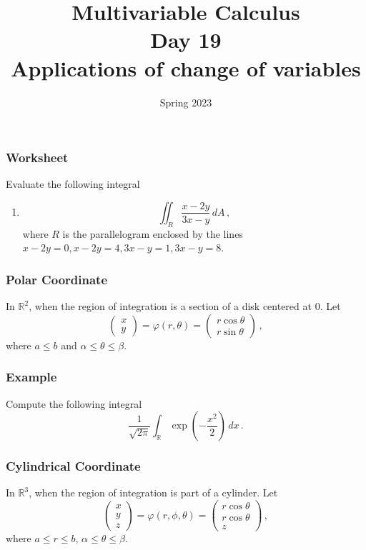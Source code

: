 \documentclass[aspectratio=169]{beamer}
\title{ Multivariable Calculus \\ Day  19 \\ Applications of change of variables }
\date{Spring 2023}
\newcommand{\R}{\mathbb{R}}
\begin{document}
\maketitle


\begin{frame}
    \frametitle{Worksheet}
    Evaluate the following integral
    \begin{enumerate}
        \item 
            \begin{equation*}
                \iint_R \frac{x - 2y}{3x - y} \, dA \,,
            \end{equation*}
            where $R$ is the parallelogram enclosed by the lines
            $x-2y = 0, x- 2y = 4, 3x-y = 1, 3x - y = 8$.

    \end{enumerate}
\end{frame}

\begin{frame}
    \frametitle{Polar Coordinate}
    In $\R^2$,
    when the region of integration is a section of a disk  centered at $0$.
    Let
    \begin{equation*}
        \begin{pmatrix}
            x \\ y
        \end{pmatrix}
        =
        \varphi(r,\theta) = 
        \begin{pmatrix}
            r\cos\theta \\
            r\sin\theta 
        \end{pmatrix} \,,
    \end{equation*}
    where $a \leq b$ and $\alpha \leq \theta \leq \beta$.
\end{frame}

\begin{frame}
    \frametitle{Example}
    Compute the following integral
    \begin{equation*}
        \frac{1}{\sqrt{2\pi}}\int_{\R} \exp\left(-\frac{x^2}{2}\right) \, dx \,.
    \end{equation*}
\end{frame}


\begin{frame}
    \frametitle{Cylindrical Coordinate}
    In $\R^3$, when the region of integration is part of a cylinder.
    Let
    \begin{equation*}
        \begin{pmatrix}
            x \\ y \\z
        \end{pmatrix}
        =
        \varphi(r,\phi,\theta) = 
        \begin{pmatrix}
            r\cos\theta\\
            r\cos\theta\\
            z
        \end{pmatrix} \,,
    \end{equation*}
    where $ a \leq r \leq b$, $\alpha \leq \theta \leq \beta$.
\end{frame}
\end{document}
